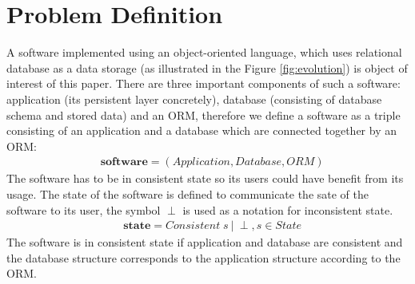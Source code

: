 \documentclass[11pt]{article}
\begin{document}
\section{Problem Definition} 
\label{sec:problem}
A software implemented using an object-oriented language, which uses relational database as a data storage (as illustrated in the Figure \ref{fig:evolution}) is object of interest of this paper. There are three important components of such a software: application (its persistent layer concretely), database (consisting of database schema and stored data) and an ORM, therefore we define a software as a triple consisting of an application and a database which are connected together by an ORM:
\begin{align*}
& \mathbf{software} = ( Application, Database, ORM )
\end{align*}
The software has to be in consistent state so its users could have benefit from its usage. The state of the software is defined to communicate the sate of the software to its user, the symbol $\perp$ is used as a notation for inconsistent state. 
\begin{align*}
& \mathbf{state} = Consistent\; s \: | \: \perp, s \in State 
\end{align*}
The software is in consistent state if application and database are consistent and the database structure corresponds to the application structure according to the ORM.
\end{document}
